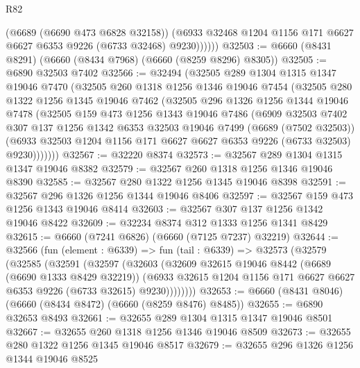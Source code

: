 \begin{lexlean}{R82}
\begin{coremodule}
              (@6689 (@6690 @473 @6828 @32158))
              (@6933 @32468 @1204 @1156 @171 @6627 @6627 @6353 @9226 (@6733 @32468) @9230))))))
@32503 := @6660 (@8431 @8291) (@6660 (@8434 @7968) (@6660 (@8259 @8296) @8305))
@32505 := @6890 @32503 @7402
@32566 := @32494
    (@32505
      @289
      @1304
      @1315
      @1347
      @19046
      @7470
      (@32505
        @260
        @1318
        @1256
        @1346
        @19046
        @7454
        (@32505
          @280
          @1322
          @1256
          @1345
          @19046
          @7462
          (@32505
            @296
            @1326
            @1256
            @1344
            @19046
            @7478
            (@32505
              @159
              @473
              @1256
              @1343
              @19046
              @7486
              (@6909
                @32503
                @7402
                @307
                @137
                @1256
                @1342
                @6353
                @32503
                @19046
                @7499
                (@6689 (@7502 @32503))
                (@6933 @32503 @1204 @1156 @171 @6627 @6627 @6353 @9226 (@6733 @32503) @9230)))))))
@32567 := @32220 @8374
@32573 := @32567 @289 @1304 @1315 @1347 @19046 @8382
@32579 := @32567 @260 @1318 @1256 @1346 @19046 @8390
@32585 := @32567 @280 @1322 @1256 @1345 @19046 @8398
@32591 := @32567 @296 @1326 @1256 @1344 @19046 @8406
@32597 := @32567 @159 @473 @1256 @1343 @19046 @8414
@32603 := @32567 @307 @137 @1256 @1342 @19046 @8422
@32609 := @32234 @8374 @312 @1333 @1256 @1341 @8429
@32615 := @6660 (@7241 @6826) (@6660 (@7125 @7237) @32219)
@32644 := @32566
    (fun (element : @6339) =>
    fun (tail : @6339) =>
    @32573
      (@32579
        (@32585
          (@32591
            (@32597
              (@32603
                (@32609
                  @32615
                  @19046
                  @8442
                  (@6689 (@6690 @1333 @8429 @32219))
                  (@6933
                    @32615
                    @1204
                    @1156
                    @171
                    @6627
                    @6627
                    @6353
                    @9226
                    (@6733 @32615)
                    @9230))))))))
@32653 := @6660 (@8431 @8046) (@6660 (@8434 @8472) (@6660 (@8259 @8476) @8485))
@32655 := @6890 @32653 @8493
@32661 := @32655 @289 @1304 @1315 @1347 @19046 @8501
@32667 := @32655 @260 @1318 @1256 @1346 @19046 @8509
@32673 := @32655 @280 @1322 @1256 @1345 @19046 @8517
@32679 := @32655 @296 @1326 @1256 @1344 @19046 @8525

\end{coremodule}
\end{lexlean}
